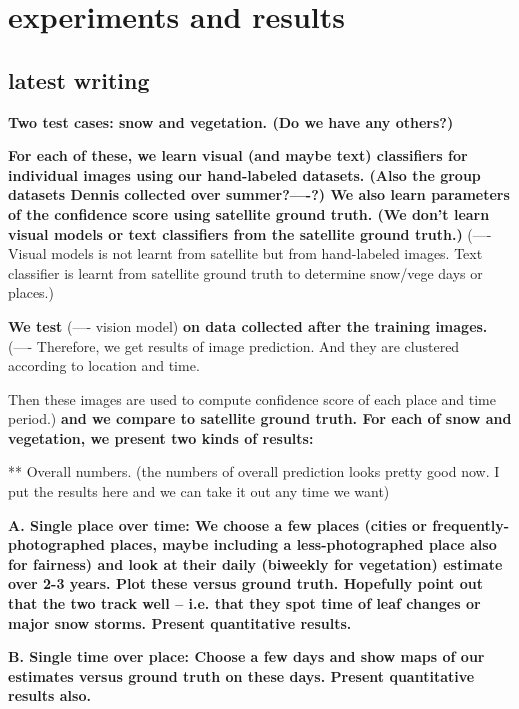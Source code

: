 \section{experiments and results}


\hfill \break
\hfill \break
\subsection*{latest writing}
\hfill \break
\hfill \break

\textbf{
Two test cases: snow and vegetation. (Do we have any others?)
}

\textbf{
For each of these, we learn visual (and maybe text) classifiers for individual images using our hand-labeled datasets. (Also the group datasets Dennis collected over summer?----?) We also learn parameters of the confidence score using satellite ground truth. (We don't learn visual models or text classifiers from the satellite ground truth.)}
(---- Visual models  is not learnt from satellite but from hand-labeled images. Text classifier is learnt from satellite ground truth to determine snow/vege days or places.) 

\textbf{We test }
(---- vision model) 
\textbf{on data collected after the training images.}                                             
(---- Therefore, we get results of image prediction. And they are clustered according to location and time. 

Then these images are used to compute confidence score of each place and time period.)
\textbf{and we compare to satellite ground truth. For each of snow and vegetation, we present two kinds of results:}

** Overall numbers.
 (the numbers of overall prediction looks pretty good now. I put the results here and we can take it out any time we want)

\textbf{
A. Single place over time: We choose a few places (cities or frequently-photographed places, maybe including a less-photographed place also for fairness) and look at their daily (biweekly for vegetation) estimate over 2-3 years. Plot these versus ground truth. Hopefully point out that the two track well -- i.e. that they spot time of leaf changes or major snow storms. Present quantitative results.
}

\textbf{
B. Single time over place: Choose a few days and show maps of our estimates versus ground truth on these days. Present quantitative results also.
}

